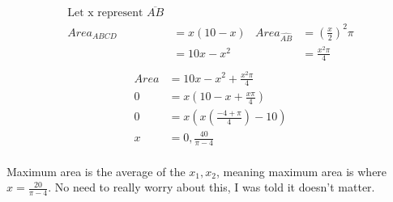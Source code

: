 \documentclass[paper=a4, fontsize=11pt]{scrartcl}
\begin{document}
\begin{figure}[h!]
\begin{align*}
        \text{Let x represent }\overline{AB}\\
        Area_{ABCD}&=x(10-x)&Area_{\widehat{AB}}&=(\frac{x}{2})^2\pi\\
        &=10x-x^2&&=\frac{x^2\pi}{4}\\
    \end{align*}
    \begin{align*}
        Area&=10x-x^2+\frac{x^2\pi}{4}\\
        0&=x(10-x+\frac{x\pi}{4})\\
        0&=x(x(\frac{-4+\pi}{4})-10)\\
        x&=0,\frac{40}{\pi-4}\\
    \end{align*}
\end{figure}
Maximum area is the average of the $x_1,x_2$, meaning maximum area is where $x=\frac{20}{\pi-4}$. No need to really worry about this, I was told it doesn't matter.
\end{document}
